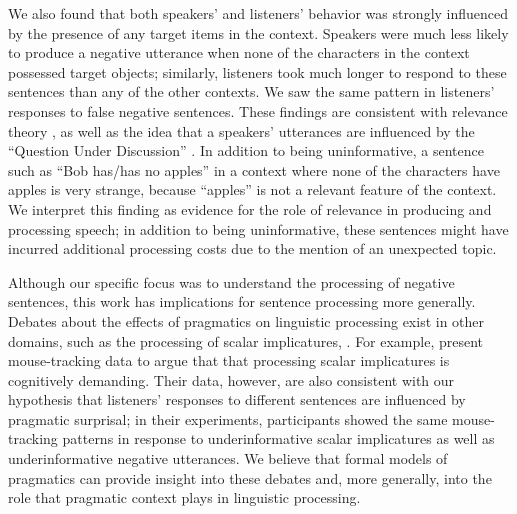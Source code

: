 \documentclass[man, noapacite]{apa2}
\begin{document}
We also found that both speakers' and listeners' behavior was strongly influenced by the presence of any target items in the context.  Speakers were much less likely to produce a negative utterance when none of the characters in the context possessed target objects; similarly, listeners took much longer to respond to these sentences than any of the other contexts.  We saw the same pattern in listeners' responses to false negative sentences.  These findings are consistent with relevance theory \cite{sperber1986}, as well as the idea that a speakers' utterances are influenced by the ``Question Under Discussion'' \cite{roberts1996}.  In addition to being uninformative, a sentence such as ``Bob has/has no apples'' in a context where none of the characters have apples is very strange, because ``apples'' is not a relevant feature of the context.  We interpret this finding as evidence for the role of relevance in producing and processing speech; in addition to being uninformative, these sentences might have incurred additional processing costs due to the mention of an unexpected topic.    



Although our specific focus was to understand the processing of negative sentences, this work has implications for sentence processing more generally.  Debates about the effects of pragmatics on linguistic processing exist in other domains, such as the processing of scalar implicatures, .  For example,  present mouse-tracking data to argue that that processing scalar implicatures is cognitively demanding. Their data, however, are also consistent with our hypothesis that listeners' responses to different sentences are influenced by pragmatic surprisal; in their experiments, participants showed the same mouse-tracking patterns in response to underinformative scalar implicatures as well as underinformative negative utterances.  We believe that formal models of pragmatics can provide insight into these debates and, more generally, into the role that pragmatic context plays in linguistic processing. 
 





\setlength{\bibleftmargin}{.125in}
\setlength{\bibindent}{-\bibleftmargin}


\end{document}
